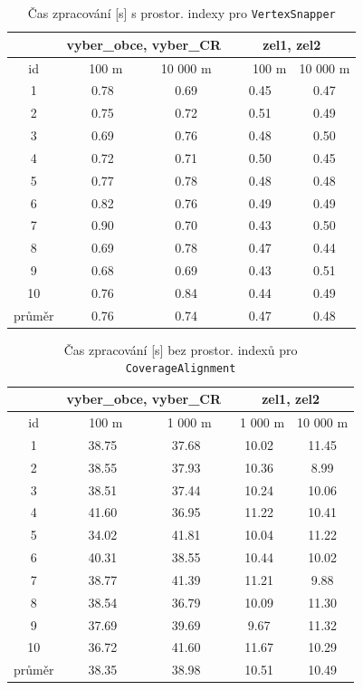 \begin{table}
\centering
 \begin{tabular}{|c|c|c|c|c|}
  \hline
     & \multicolumn{2}{c|}{vyber\_obce, vyber\_CR} & 
	\multicolumn{2}{c|}{zel1, zel2} \\
  \hline
   id  &  ~~100 m~ & 10 000 m & ~~~100 m & 10 000 m\\
  \hline
  \hline
  1  &0.78 & 0.69 &  0.45 & 0.47 \\
  2  &0.75 & 0.72 &  0.51 & 0.49 \\
  3  &0.69 & 0.76 &  0.48 & 0.50 \\
  4  &0.72 & 0.71 &  0.50 & 0.45 \\
  5  &0.77 & 0.78 &  0.48 & 0.48 \\
  6  &0.82 & 0.76 &  0.49 & 0.49 \\
  7  &0.90 & 0.70 &  0.43 & 0.50 \\
  8  &0.69 & 0.78 &  0.47 & 0.44 \\
  9  &0.68 & 0.69 &  0.43 & 0.51 \\
  10 &0.76 & 0.84 &  0.44 & 0.49 \\
  \hline
  \hline
  průměr & 0.76 & 0.74 &0.47 &0.48\\
  \hline
 \end{tabular}
  \caption{ Čas zpracování [s] s prostor. indexy pro 
	    \texttt{Vertex\-Snapper}}
  \label{tab:vs-s}
\end{table}

\begin{table}
\centering
 \begin{tabular}{|c|c|c|c|c|}
  \hline
     & \multicolumn{2}{c|}{vyber\_obce, vyber\_CR} & 
	\multicolumn{2}{c|}{zel1, zel2} \\
  \hline
   id  &  ~~100 m~ & ~1 000 m & ~1 000 m & 10 000 m\\
  \hline
  \hline
1  & 38.75 & 37.68 & 10.02 & 11.45 \\ 
2  & 38.55 & 37.93 & 10.36 & 8.99  \\
3  & 38.51 & 37.44 & 10.24 & 10.06 \\
4  & 41.60 & 36.95 & 11.22 & 10.41 \\
5  & 34.02 & 41.81 & 10.04 & 11.22 \\
6  & 40.31 & 38.55 & 10.44 & 10.02 \\
7  & 38.77 & 41.39 & 11.21 & 9.88 \\
8  & 38.54 & 36.79 & 10.09 & 11.30 \\
9  & 37.69 & 39.69 & 9.67  & 11.32 \\
10 & 36.72 & 41.60 & 11.67 & 10.29 \\
  \hline
  \hline
  průměr & 38.35 & 38.98 & 10.51 & 10.49\\
  \hline
 \end{tabular}
  \caption{ Čas zpracování [s] bez prostor. indexů pro 
	    \texttt{Coverage\-Alignment}}
  \label{tab:ca-bez}
\end{table}

